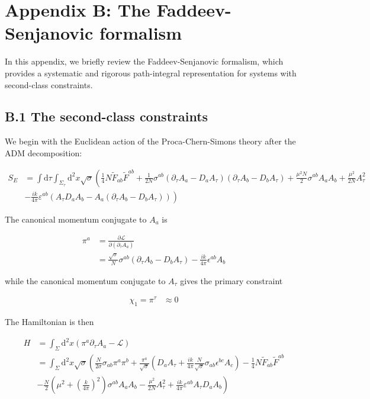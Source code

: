 \section{Appendix B: The Faddeev-Senjanovic formalism}\label{app:faddeev-senjanovic}

In this appendix, we briefly review the Faddeev-Senjanovic formalism, which provides a systematic and rigorous path-integral representation for systems with second-class constraints.

\subsection{B.1 The second-class constraints}\label{subsec:fs-second-class-constraints}

We begin with the Euclidean action of the Proca-Chern-Simons theory after the ADM decomposition:

\begin{align}
S_{E} & =\int \mathrm{d}\tau \int _{\Sigma _{\tau}} \mathrm{d}^{2}x\sqrt{ \sigma }\left(\frac{1}{4}N\tilde{F}_{ab}\tilde{F}^{ab}+\frac{1}{2N}\sigma ^{ab}(\partial _{\tau}A_{a}-D_{a}A_{\tau})(\partial _{\tau}A_{b}-D_{b}A_{\tau})+\frac{\mu ^{2}N}{2}\sigma ^{ab}A_{a}A_{b}+\frac{\mu ^{2}}{2N}A_{\tau}^{2}\right. \\
 & \left.-\frac{ik}{4\pi}\varepsilon ^{ab}(A_{\tau}D_{a}A_{b}-A_{a}(\partial _{\tau}A_{b}-D_{b}A_{\tau}))\right)
\end{align}

The canonical momentum conjugate to $\displaystyle{A_{a}}$ is

\begin{align}
\pi ^{a} & = \frac{\partial \mathcal{L}}{\partial(\partial _{\tau}A_{a})} \\
 & =\frac{\sqrt{ \sigma }}{N}\sigma ^{ab}(\partial _{\tau}A_{b}-D_{b}A_{\tau})-\frac{ik}{4\pi}\epsilon^{ab}A_{b}
\end{align}

while the canonical momentum conjugate to $\displaystyle{A_{\tau}}$ gives the primary constraint

\begin{align}
\chi _{1}=\pi ^{\tau} & \approx 0
\end{align}

The Hamiltonian is then

\begin{align}
H & =\int _{\Sigma}\mathrm{d}^{2}x\left(\pi ^{a}\partial _{\tau}A_{a}-\mathcal{L}\right) \\
 & =\int _{\Sigma}\mathrm{d}^{2}x\sqrt{ \sigma }\left(\frac{N}{2\sigma}\sigma _{ab}\pi ^{a}\pi ^{b}+\frac{\pi ^{a}}{\sqrt{ \sigma }}\left( D_{a}A_{\tau}+\frac{ik}{4\pi} \frac{N}{\sqrt{ \sigma }}\sigma _{ab} \epsilon ^{bc}A_{c} \right)-\frac{1}{4}N\tilde{F}_{ab}\tilde{F}^{ab}\right. \\
 & \left.-\frac{N}{2}\left(\mu ^{2}+\left(\frac{k}{4\pi}\right)^{2}\right)\sigma ^{ab}A_{a}A_{b}-\frac{\mu ^{2}}{2N}A_{\tau}^{2}+\frac{ik}{4\pi}\varepsilon ^{ab}A_{\tau}D_{a}A_{b}\right)
\end{align}

